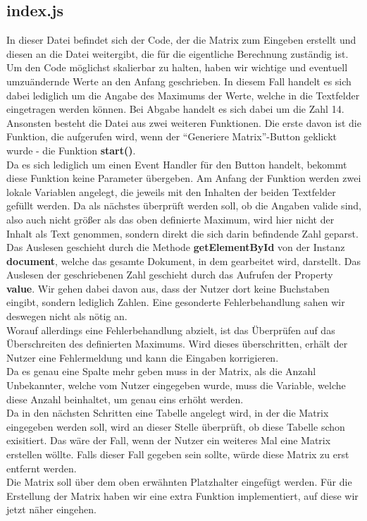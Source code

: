 \documentclass[a4paper,oneside,titlepage,12pt]{article}
\begin{document}
\subsection{index.js}
In dieser Datei befindet sich der Code, der die Matrix zum Eingeben erstellt und diesen an die Datei weitergibt, die für die eigentliche Berechnung zuständig ist. \\ Um den Code möglichst skalierbar zu halten, haben wir wichtige und eventuell umzuändernde Werte an den Anfang geschrieben. In diesem Fall handelt es sich dabei lediglich um die Angabe des Maximums der Werte, welche in die Textfelder eingetragen werden können. Bei Abgabe handelt es sich dabei um die Zahl 14. \\ Ansonsten besteht die Datei aus zwei weiteren Funktionen. Die erste davon ist die Funktion, die aufgerufen wird, wenn der ``Generiere Matrix''-Button geklickt wurde - die Funktion \textbf{start()}. \\ Da es sich lediglich um einen Event Handler für den Button handelt, bekommt diese Funktion keine Parameter übergeben. Am Anfang der Funktion werden zwei lokale Variablen angelegt, die jeweils mit den Inhalten der beiden Textfelder gefüllt werden. Da als nächstes überprüft werden soll, ob die Angaben valide sind, also auch nicht größer als das oben definierte Maximum, wird hier nicht der Inhalt als Text genommen, sondern direkt die sich darin befindende Zahl geparst. \\ Das Auslesen geschieht durch die Methode \textbf{getElementById} von der Instanz \textbf{document}, welche das gesamte Dokument, in dem gearbeitet wird, darstellt. Das Auslesen der geschriebenen Zahl geschieht durch das Aufrufen der Property \textbf{value}. Wir gehen dabei davon aus, dass der Nutzer dort keine Buchstaben eingibt, sondern lediglich Zahlen. Eine gesonderte Fehlerbehandlung sahen wir deswegen nicht als nötig an. \\ Worauf allerdings eine Fehlerbehandlung abzielt, ist das Überprüfen auf das Überschreiten des definierten Maximums. Wird dieses überschritten, erhält der Nutzer eine Fehlermeldung und kann die Eingaben korrigieren. \\ Da es genau eine Spalte mehr geben muss in der Matrix, als die Anzahl Unbekannter, welche vom Nutzer eingegeben wurde, muss die Variable, welche diese Anzahl beinhaltet, um genau eins erhöht werden. \\ Da in den nächsten Schritten eine Tabelle angelegt wird, in der die Matrix eingegeben werden soll, wird an dieser Stelle überprüft, ob diese Tabelle schon exisitiert. Das wäre der Fall, wenn der Nutzer ein weiteres Mal eine Matrix erstellen wöllte. Falls dieser Fall gegeben sein sollte, würde diese Matrix zu erst entfernt werden. \\ Die Matrix soll über dem oben erwähnten Platzhalter eingefügt werden. Für die Erstellung der Matrix haben wir eine extra Funktion implementiert, auf diese wir jetzt näher eingehen. \\ 
\end{document}

